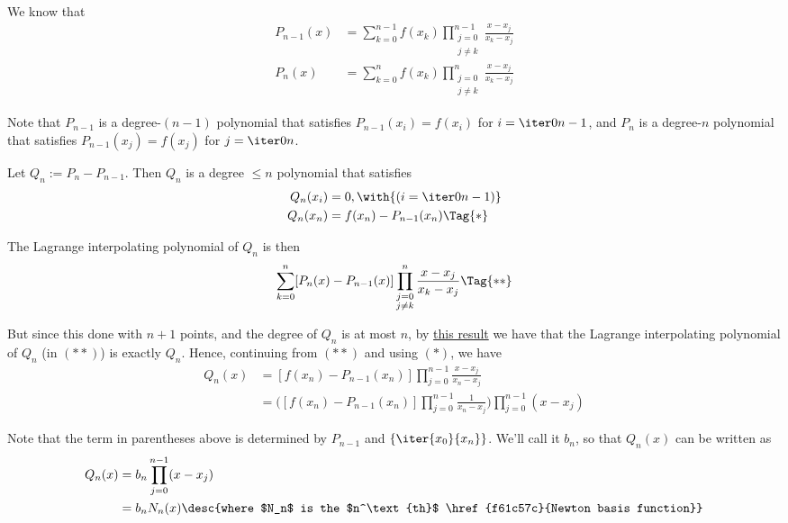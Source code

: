 We know that
\begin{align*}
  P_{n-1}(x) &=\sum_{k=0}^{n-1}f(x_k)\prod_{\substack{j=0 \\j\neq k}}^{n-1}\frac{x-x_j}{x_k-x_j}\\
  P_{n}(x)   &=\sum_{k=0}^{n}f(x_k)\prod_{\substack{j=0   \\j\neq k}}^{n}\frac{x-x_j}{x_k-x_j}
\end{align*}

Note that $P_{n-1}$ is a degree-$(n-1)$ polynomial that satisfies
$P_{n-1}(x_i)=f(x_i)$ for $i=\iter0{n-1}$, and $P_n$ is a degree-$n$ polynomial
that satisfies $P_{n-1}(x_j)=f(x_j)$ for $j=\iter0n$.

Let $Q_n:=P_n-P_{n-1}$. Then $Q_n$ is a degree $\leq n$ polynomial that
satisfies
\begin{align*}
  Q_n(x_i) &=0,\with{(i=\iter0{n-1})}   \\
  Q_n(x_n) &=f(x_n)-P_{n-1}(x_n)\Tag{*}
\end{align*}

The Lagrange interpolating polynomial of $Q_n$ is then
\begin{equation*}
  \sum_{k=0}^n[P_n(x)-P_{n-1}(x)]\prod_{\substack{j=0\\j\neq
      k}}^n\frac{x-x_j}{x_k-x_j}\Tag{**}
\end{equation*}

But since this done with $n+1$ points, and the degree of $Q_n$ is at most $n$,
by \href{d7dc069}{this result} we have that the Lagrange interpolating
polynomial of $Q_n$ (in $(**)$) is exactly $Q_n$. Hence, continuing from $(**)$
and using $(*)$, we have
\begin{align*}
  Q_n(x) &=[f(x_n)-P_{n-1}(x_n)]\prod_{j=0}^{n-1}\frac{x-x_j}{x_n-x_j}                                 \\
         &=\biggl([f(x_n)-P_{n-1}(x_n)]\prod_{j=0}^{n-1}\frac1{x_n-x_j}\biggr)\prod_{j=0}^{n-1}(x-x_j)
\end{align*}

Note that the term in parentheses above is determined by $P_{n-1}$ and
$\{\iter{x_0}{x_n}\}$. We'll call it $b_n$, so that $Q_n(x)$ can be written as
\begin{align*}
  Q_n(x) &=b_n\prod_{j=0}^{n-1}(x-x_j)                                                            \\
         &=b_nN_n(x)\desc{where $N_n$ is the $n^\text{th}$ \href{f61c57c}{Newton basis function}}
\end{align*}

